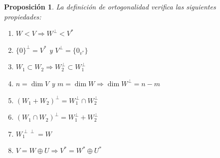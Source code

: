 \documentclass[10pt,a4paper,openright]{book}
\theoremstyle{break}
\newtheorem*{prop}{Proposición}
\begin{document}
\begin{prop}
La definición de ortogonalidad verifica las siguientes propiedades:
\begin{enumerate}
\item $W<V\Rightarrow W^\perp<V^*$
\item $\{0\}^\perp = V^*$ y $V^\perp = \{0_{v^*}\}$

\item $W_1\subset W_2\Rightarrow W_2^\perp \subset W_1^\perp$
\item $n=\dim V$ y $m=\dim W\Rightarrow \dim W^\perp = n-m$
\item $(W_1+W_2)^\perp = W_1^\perp \cap W_2^\perp$
\item $(W_1\cap W_2)^\perp= W_1^\perp + W_2^\perp$
\item $W_1^{\perp\perp}=W$
\item $V = W \oplus U \Rightarrow V^* = W^* \oplus U^*$
\end{enumerate}
\end{prop}
\end{document}
